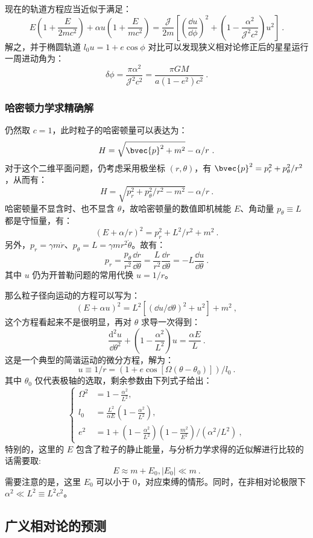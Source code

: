 现在的轨道方程应当近似于满足：
\begin{equation}
E\left(1 + \frac{E}{2mc^2}\right) + \alpha u \left(1 + \frac{E}{mc^2}\right) = \frac{\mathcal J}{2m} \left[ \left(\frac{\dd u}{\dd \phi}\right)^2 + \left( 1-\frac{\alpha^2}{\mathcal J^2 c^2} \right) u^2 \right]~.
\end{equation}
解之，并于椭圆轨道 $l_0 u = 1 + e \cos \phi$ 对比可以发现狭义相对论修正后的星星运行一周进动角为：
\begin{equation}
\delta \phi = \frac{\pi \alpha^2}{\mathcal J^2c^2} = \frac{\pi G M}{a (1-e^2) c^2} ~.
\end{equation}


\subsubsection{哈密顿力学求精确解}
仍然取 $c=1$，此时粒子的哈密顿量可以表达为：
$$H = \sqrt{\bvec{p}^2 + m^2} - \alpha/r ~.$$
对于这个二维平面问题，仍考虑采用极坐标 $(r, \theta)$，有 $\bvec{p}^2 = p_r^2 + p_\theta^2/r^2$，从而有：
$$H = \sqrt{p_r^2+p_\theta^2/r^2 -m^2}-\alpha/r ~.$$
哈密顿量不显含时、也不显含 $\theta$，故哈密顿量的数值即机械能 $E$、角动量 $p_\theta \equiv  L$ 都是守恒量，有：
$$\left(E + \alpha/r\right) ^2 = p_r^2 + L^2/r^2 + m^2 ~.$$
另外，$p_r = \gamma m \dot r$、$p_\theta = L = \gamma m r^2 \dot \theta$。故有：
$$p_r = \frac{p_\theta}{r^2}\frac{\dd r}{\dd \theta} = \frac{L}{r^2} \frac{\dd r}{\dd \theta} = -L \frac{\dd u}{\dd \theta} ~.$$
其中 $u$ 仍为开普勒问题的常用代换 $u = 1/r$。

那么粒子径向运动的方程可以写为：
$$ (E+\alpha u)^2 = L^2 [(\dd u/\dd \theta)^2 + u^2] + m^2 ~,$$
这个方程看起来不是很明显，再对 $\theta$ 求导一次得到：
$$\frac{\mathrm{d}^2 u}{{\dd \theta ^2}} + \left(1-\frac{\alpha^2}{L^2}\right) u = \frac{\alpha E}{L} ~.$$
这是一个典型的简谐运动的微分方程，解为：
$$u \equiv 1/r = (1 + e \cos[\Omega (\theta - \theta_0)])/l_0 ~.$$
其中 $\theta_0$ 仅代表极轴的选取，剩余参数由下列式子给出：
\begin{equation}
\left \{
\begin{aligned}
\Omega^2 &= 1-\frac{\alpha^2}{L^2}, \\
l_0 &= \frac{L^2}{\alpha E} \left( 1-\frac{\alpha^2}{L^2} \right), \\ 
e^2 &= 1 + {\left(1-\frac{\alpha^2}{L^2}\right) \left(1-\frac{m^2}{E^2}\right)/(\alpha^2 / L^2) } ~,
\end{aligned}
\right .
\end{equation}
特别的，这里的 $E$ 包含了粒子的静止能量，与分析力学求得的近似解进行比较的话需要取:
$$E \approx m + E_0, |E_0| \ll m ~.$$
需要注意的是，这里 $E_0$ 可以小于 $0$，对应束缚的情形。同时，在非相对论极限下 $\alpha^2 \ll L^2 \equiv L^2c^2$。

\subsection{广义相对论的预测}